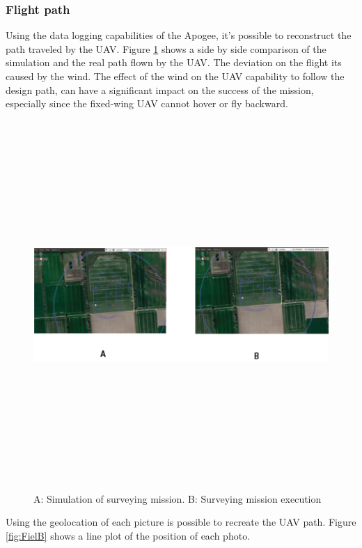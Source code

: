 \subsubsection{Flight path}
Using the data logging capabilities of the Apogee, it's possible to reconstruct the path traveled by the UAV.
Figure \ref{fig:SimVReal} shows a side by side comparison of the simulation and the real path flown by the UAV. The deviation on the flight its caused by the wind. The effect of the wind on the UAV capability to follow the design path, can have a significant impact on the success of the mission, especially since the fixed-wing UAV cannot hover or fly backward. 
\begin{figure}[H]
\centering
\includegraphics[width=14cm,height=14cm,keepaspectratio]{imagenes/SimVsreallity.png}
\caption{ A: Simulation of surveying mission. B: Surveying mission execution}
\label{fig:SimVReal}
\end{figure}
Using the geolocation of each picture is possible to recreate the UAV path. Figure \ref{fig:FielB} shows a line plot of the position of each photo.
